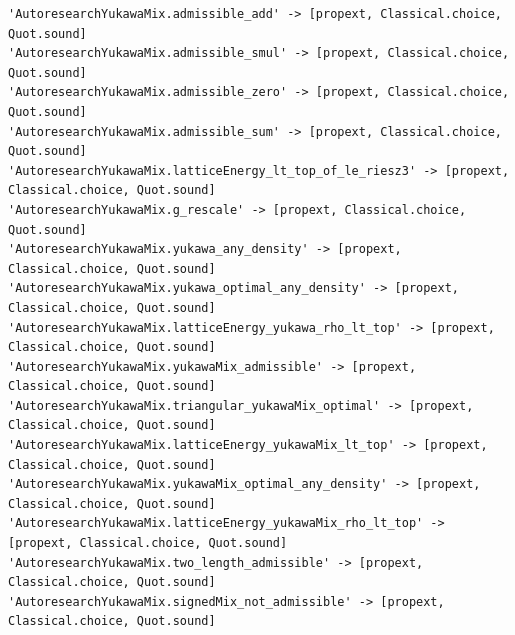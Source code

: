 \begin{Verbatim}[fontsize=\scriptsize,frame=single,framesep=1.5mm]
'AutoresearchYukawaMix.admissible_add' -> [propext, Classical.choice, Quot.sound]
'AutoresearchYukawaMix.admissible_smul' -> [propext, Classical.choice, Quot.sound]
'AutoresearchYukawaMix.admissible_zero' -> [propext, Classical.choice, Quot.sound]
'AutoresearchYukawaMix.admissible_sum' -> [propext, Classical.choice, Quot.sound]
'AutoresearchYukawaMix.latticeEnergy_lt_top_of_le_riesz3' -> [propext, Classical.choice, Quot.sound]
'AutoresearchYukawaMix.g_rescale' -> [propext, Classical.choice, Quot.sound]
'AutoresearchYukawaMix.yukawa_any_density' -> [propext, Classical.choice, Quot.sound]
'AutoresearchYukawaMix.yukawa_optimal_any_density' -> [propext, Classical.choice, Quot.sound]
'AutoresearchYukawaMix.latticeEnergy_yukawa_rho_lt_top' -> [propext, Classical.choice, Quot.sound]
'AutoresearchYukawaMix.yukawaMix_admissible' -> [propext, Classical.choice, Quot.sound]
'AutoresearchYukawaMix.triangular_yukawaMix_optimal' -> [propext, Classical.choice, Quot.sound]
'AutoresearchYukawaMix.latticeEnergy_yukawaMix_lt_top' -> [propext, Classical.choice, Quot.sound]
'AutoresearchYukawaMix.yukawaMix_optimal_any_density' -> [propext, Classical.choice, Quot.sound]
'AutoresearchYukawaMix.latticeEnergy_yukawaMix_rho_lt_top' -> [propext, Classical.choice, Quot.sound]
'AutoresearchYukawaMix.two_length_admissible' -> [propext, Classical.choice, Quot.sound]
'AutoresearchYukawaMix.signedMix_not_admissible' -> [propext, Classical.choice, Quot.sound]
\end{Verbatim}
